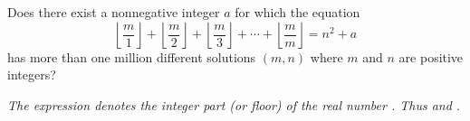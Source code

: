 Does there exist a nonnegative integer $a$ for which the equation
\[\left\lfloor\frac{m}{1}\right\rfloor + \left\lfloor\frac{m}{2}\right\rfloor + \left\lfloor\frac{m}{3}\right\rfloor + \cdots + \left\lfloor\frac{m}{m}\right\rfloor = n^2 + a\]has more than one million different solutions $(m, n)$ where $m$ and $n$ are positive integers?

\textit{The expression  denotes the integer part (or floor) of the real number . Thus  and .}